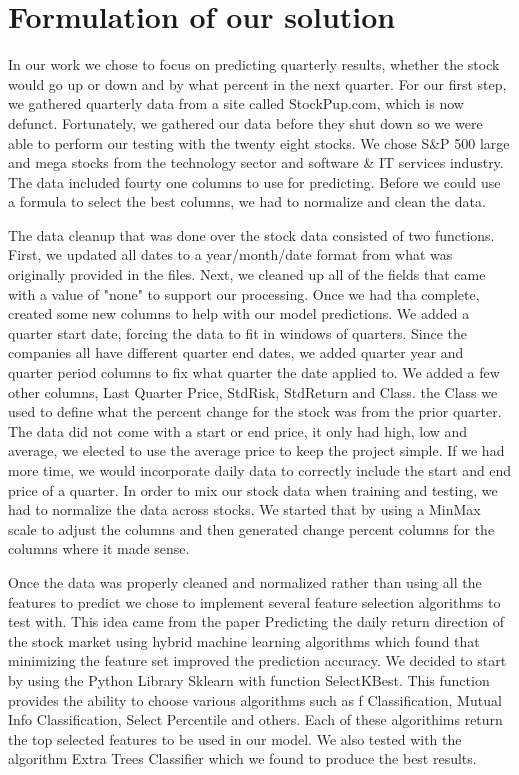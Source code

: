 \documentclass[conference]{IEEEtran}
\begin{document}
\section{Formulation of our solution}
In our work we chose to focus on predicting quarterly results, whether the stock would go up or down and by what percent in the next quarter.  For our first step, we gathered quarterly data from a site called StockPup.com, which is now defunct. Fortunately, we gathered our data before they shut down so we were able to perform our testing with the twenty eight stocks. We chose S\&P 500 large and mega stocks from the technology sector and software \& IT services industry.  The data included fourty one columns to use for predicting.  Before we could use a formula to select the best columns, we had to normalize and clean the data. 

The data cleanup that was done over the stock data consisted of two functions.  First, we updated all dates to a year/month/date format from what was originally provided in the files.  Next, we cleaned up all of the fields that came with a value of "none" to support our processing.  Once we had tha complete, created some new columns to help with our model predictions.  We added a quarter start date, forcing the data to fit in windows of quarters.  Since the companies all have different quarter end dates, we added quarter year and quarter period columns to fix what quarter the date applied to.  We added a few other columns, Last Quarter Price, StdRisk, StdReturn and Class.  the Class we used to define what the percent change for the stock was from the prior quarter.  The data did not come with a start or end price, it only had high, low and average, we elected to use the average price to keep the project simple.  If we had more time, we would incorporate daily data to correctly include the start and end price of a quarter.  In order to mix our stock data when training and testing, we had to normalize the data across stocks.  We started that by using a MinMax scale to adjust the columns and then generated change percent columns for the columns where it made sense.  

Once the data was properly cleaned and normalized rather than using all the features to predict we chose to implement several feature selection algorithms to test with.  This idea came from the paper Predicting the daily return direction of the stock market using hybrid machine learning algorithms \cite{DailyReturnDirection} which found that minimizing the feature set improved the prediction accuracy.  We decided to start by using the Python Library Sklearn with function SelectKBest.  This function provides the ability to choose various algorithms such as f Classification, Mutual Info Classification, Select Percentile and others.  Each of these algorithims return the top selected features to be used in our model. We also tested with the algorithm Extra Trees Classifier which we found to produce the best results.
\end{document}
